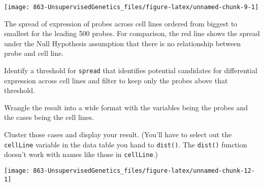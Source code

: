 \documentclass[]{tufte-handout}
\begin{document}
\begin{marginfigure}
\texttt{[image: 863-UnsupervisedGenetics\_files/figure-latex/unnamed-chunk-9-1]} \caption[The spread of expression of probes across cell lines ordered from biggest to smallest for the leading 500 probes]{The spread of expression of probes across cell lines ordered from biggest to smallest for the leading 500 probes. For comparison, the red line shows the spread under the Null Hypothesis assumption that there is no relationship between probe and cell line.}\label{fig:unnamed-chunk-9}
\end{marginfigure}

Identify a threshold for \texttt{spread} that identifies potential
candidates for differential expression across cell lines and filter to
keep only the probes above that threshold.

Wrangle the result into a wide format with the variables being the
probes and the cases being the cell lines.

\enlargethispage{1.5in}

Cluster those cases and display your result. (You'll have to select out
the \texttt{cellLine} variable in the data table you hand to
\texttt{dist()}. The \texttt{dist()} function doesn't work with names
like those in \texttt{cellLine}.)

\texttt{[image: 863-UnsupervisedGenetics\_files/figure-latex/unnamed-chunk-12-1]}
\end{document}
